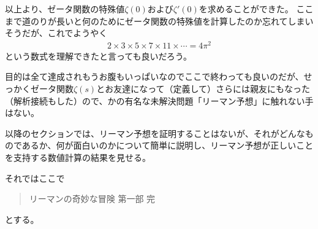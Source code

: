 \documentclass[11pt,b5paper,papersize,dvipdfmx]{jsbook}
\begin{document}
以上より、ゼータ関数の特殊値$\zeta(0)$および$\zeta'(0)$を求めることができた。
ここまで道のりが長いと何のためにゼータ関数の特殊値を計算したのか忘れてしまいそうだが、これでようやく
\begin{align*}
  2\times 3\times 5\times 7\times 11\times\cdots = 4\pi^2
\end{align*}
という数式を理解できたと言っても良いだろう。\par

目的は全て達成されもうお腹もいっぱいなのでここで終わっても良いのだが、せっかくゼータ関数$\zeta(s)$とお友達になって（定義して）さらには親友にもなった（解析接続もした）ので、かの有名な未解決問題「リーマン予想」に触れない手はない。\par
以降のセクションでは、リーマン予想を証明することはないが、それがどんなものであるか、何が面白いのかについて簡単に説明し、リーマン予想が正しいことを支持する数値計算の結果を見せる。\par

それではここで 
\begin{quote}
  リーマンの奇妙な冒険 第一部 完
\end{quote}
とする。


\end{document}
